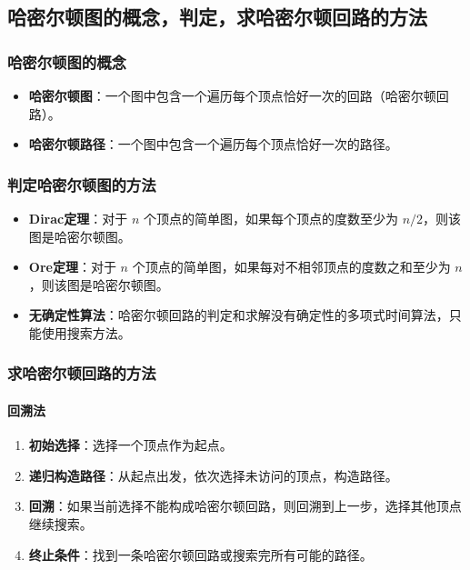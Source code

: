 \documentclass[UTF8]{ctexart}
\begin{document}
\subsection{哈密尔顿图的概念，判定，求哈密尔顿回路的方法}
\subsubsection{哈密尔顿图的概念}
\begin{itemize}
    \item \textbf{哈密尔顿图}：一个图中包含一个遍历每个顶点恰好一次的回路（哈密尔顿回路）。
    \item \textbf{哈密尔顿路径}：一个图中包含一个遍历每个顶点恰好一次的路径。
\end{itemize}

\subsubsection{判定哈密尔顿图的方法}
\begin{itemize}
    \item \textbf{Dirac定理}：对于 \( n \) 个顶点的简单图，如果每个顶点的度数至少为 \( n/2 \)，则该图是哈密尔顿图。
    \item \textbf{Ore定理}：对于 \( n \) 个顶点的简单图，如果每对不相邻顶点的度数之和至少为 \( n \)，则该图是哈密尔顿图。
    \item \textbf{无确定性算法}：哈密尔顿回路的判定和求解没有确定性的多项式时间算法，只能使用搜索方法。
\end{itemize}

\subsubsection{求哈密尔顿回路的方法}
\paragraph{回溯法}
\begin{enumerate}
    \item \textbf{初始选择}：选择一个顶点作为起点。
    \item \textbf{递归构造路径}：从起点出发，依次选择未访问的顶点，构造路径。
    \item \textbf{回溯}：如果当前选择不能构成哈密尔顿回路，则回溯到上一步，选择其他顶点继续搜索。
    \item \textbf{终止条件}：找到一条哈密尔顿回路或搜索完所有可能的路径。
\end{enumerate}
\end{document}
